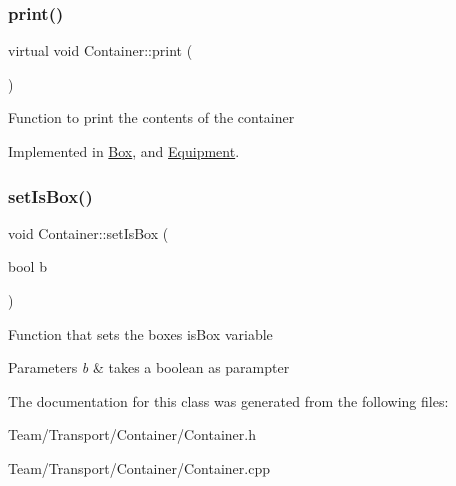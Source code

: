 \subsubsection{\texorpdfstring{print()}{print()}}
{\footnotesize\ttfamily virtual void Container\+::print (\begin{DoxyParamCaption}{ }\end{DoxyParamCaption})\hspace{0.3cm}{\ttfamily [pure virtual]}}

Function to print the contents of the container 

Implemented in \hyperlink{classBox_a7f9cef3d9324289ae0fb4ec1aa50db9d}{Box}, and \hyperlink{classEquipment_a78d184209461b59fe23dabe8f9325dfe}{Equipment}.

\mbox{\label{classContainer_a9bba4330d6f63a7696f6932819177cac}} 
\subsubsection{\texorpdfstring{set\+Is\+Box()}{setIsBox()}}
{\footnotesize\ttfamily void Container\+::set\+Is\+Box (\begin{DoxyParamCaption}\item[{bool}]{b }\end{DoxyParamCaption})}

Function that sets the boxes is\+Box variable 
\begin{DoxyParams}{Parameters}
{\em b} & takes a boolean as parampter \\
\hline
\end{DoxyParams}


The documentation for this class was generated from the following files\+:\begin{DoxyCompactItemize}
\item 
Team/\+Transport/\+Container/Container.\+h\item 
Team/\+Transport/\+Container/Container.\+cpp\end{DoxyCompactItemize}

